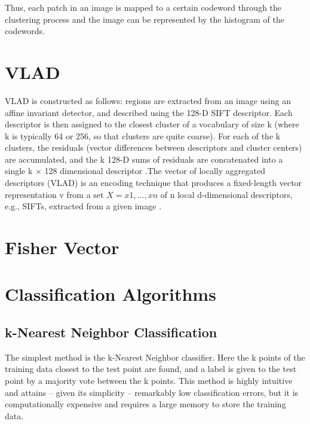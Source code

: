 \documentclass[12pt]{article}
\numberwithin{equation}{section}
\numberwithin{table}{section}
\numberwithin{figure}{section}
\begin{document}
Thus, each patch in an image is mapped to a certain codeword through the clustering process and the image can be represented by the histogram of the codewords.









\section{VLAD} \label{vlad}

VLAD is constructed as follows: regions are extracted from an image using an affine invariant detector, and described using the 128-D SIFT descriptor. Each descriptor is then assigned to the closest cluster of a vocabulary of size k (where k is typically 64 or 256, so that clusters are quite coarse). For each of the k clusters, the residuals (vector differences between descriptors and cluster centers) are accumulated, and the k 128-D sums of residuals are concatenated into a single k × 128 dimensional descriptor \cite{Arandjelovic2013}.The vector of locally aggregated descriptors (VLAD) is an encoding technique that produces a fixed-length vector representation v from a set $X = {x1, . . . , xn}$ of n local d-dimensional descriptors, e.g., SIFTs, extracted from a given image \cite{Delhumeau2013}.

\section{Fisher Vector} \label{fv}

\cite{Sanchez2013}


\section{Classification Algorithms} \label{classalgs}

\subsection{k-Nearest Neighbor Classification} \label{knn}
The simplest method is the k-Nearest Neighbor classifier. Here the k points of the training data closest to the test point are found, and a label is given to the test point by a majority vote between the k points. This method is highly intuitive and attains – given its simplicity – remarkably low classification errors, but it is computationally expensive and requires a large memory to store the training data.
\end{document}

